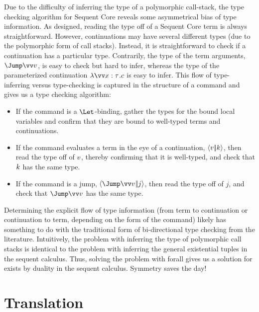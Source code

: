 \documentclass{article}
\begin{document}
Due to the difficulty of inferring the type of a polymorphic call-stack, the
type checking algorithm for Sequent Core reveals some asymmetrical bias of type
information.  As designed, reading the type off of a Sequent Core term is always
straightforward.  However, continuations may have several different types (due
to the polymorphic form of call stacks).  Instead, it is straightforward to
check if a continuation has a particular type.  Contrarily, the type of the term
arguments, $\Jump\vect{\tm}$, is easy to check but hard to infer, whereas the
type of the parameterized continuation $\fnk{\vect{x:\ty}}\cmd$ is easy to
infer.  This flow of type-inferring versus type-checking is captured in the
structure of a command and gives us a type checking algorithm:
\begin{itemize}
\item If the command is a $\Let$-binding, gather the types for the bound local
  variables and confirm that they are bound to well-typed terms and
  continuations.
\item If the command evaluates a term in the eye of a continuation,
  $\left\langle{v}\middle|\!\middle|{k}\right\rangle$, then read the type off of $v$, thereby confirming that it
  is well-typed, and check that $k$ has the same type.
\item If the command is a jump, $\jump{\vect{\tm}}{j}$, then read the type off
  of $j$, and check that $\Jump\vect{\tm}$ has the same type.
\end{itemize}
Determining the explicit flow of type information (from term to continuation or
continuation to term, depending on the form of the command) likely has something
to do with the traditional form of bi-directional type checking from the
literature.  Intuitively, the problem with inferring the type of polymorphic
call stacks is identical to the problem with inferring the general existential
tuples in the sequent calculus.  Thus, solving the problem with forall gives us
a solution for exists by duality in the sequent calculus.  Symmetry saves the
day!

\section{Translation}
\label{sec:translation}
\end{document}
